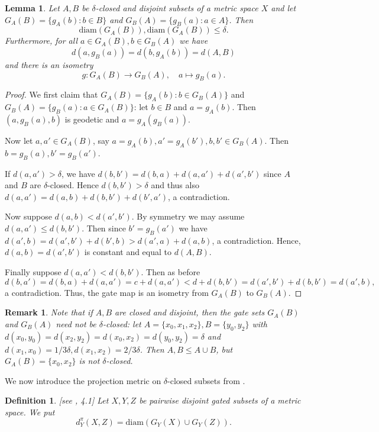 \documentclass{amsart}
\renewcommand{\d}{\delta}
\newcommand{\diam}{\mathrm{diam}}
\newtheorem{definition}[defi]{Definition}
\newtheorem{lemma}[defi]{Lemma}
\newtheorem{remark}[defi]{Remark}
\begin{document}
\begin{lemma}\label{lem: projections}
Let $A, B$ be   $\d$-closed and disjoint subsets of a metric space $X$ and let $G_A(B)=\{g_A(b)\colon b\in B\}$ and $G_B(A)=\{g_B(a)\colon a\in A\}$.
Then \[\diam(G_A(B)), \diam(G_A(B))\leq\d.\] 
Furthermore, for all $a\in G_A(B), b\in G_B(A)$ we have  \[d(a,g_B(a))=d(b,g_A(b))=d(A,B)\] and there is an isometry \[g:G_A(B)\longrightarrow G_B(A),\quad a\mapsto g_B(a).\]


\end{lemma}
\begin{proof}
We first claim that $G_A(B)=\{g_A(b)\colon b\in G_B(A)\}$ and $G_B(A)=\{g_B(a)\colon a\in G_A(B)\}$: let $b\in B$ and $a=g_A(b)$.
Then $(a,g_B(a),b)$ is geodetic and $a=g_A(g_B(a))$.


Now let $a, a'\in G_A(B)$, say $a=g_A(b),a'=g_A(b'), b,b'\in G_B(A)$. Then $b=g_B(a), b'=g_B(a')$.


If $d(a,a')>\d$, we have $d(b,b')=d(b,a)+d(a,a')+d(a',b')$ since $A$ and $B$ are  $\d$-closed. Hence $d(b,b')>\d$ and thus also $d(a,a')=d(a,b)+d(b,b')+d(b',a')$, a contradiction.

Now suppose $d(a,b)<d(a',b')$. By symmetry we may assume $d(a,a')\leq d(b,b')$. Then since $b'=g_B(a')$ we have $d(a',b)=d(a',b')+d(b',b)>d(a',a)+d(a,b)$, a contradiction. Hence, $d(a,b)=d(a',b')$ is constant and equal to $d(A,B)$.

Finally suppose $d(a,a')<d(b,b')$. Then as before 
\[ d(b,a')=d(b,a)+d(a,a')=c+d(a,a')<d+d(b,b')=d(a',b')+d(b,b')=d(a',b),\]
 a contradiction. Thus, the gate map is an isometry from $G_A(B)$ to $G_B(A)$.
\end{proof}


\begin{remark}\label{rem:gate set not closed}
Note that if $A, B$ are closed and disjoint, then the gate sets $G_A(B)$ and $G_B(A)$ need not be   $\d$-closed: let $A=\{x_0,x_1,x_2\}, B=\{y_0,y_2\}$ with $d(x_0,y_0)=d(x_2,y_2)=d(x_0,x_2)=d(y_0,y_2)=\d$ and $d(x_1,x_0)=1/3\d, d(x_1,x_2)=2/3\d$. Then $A, B\leq A\cup B$, but $G_A(B)=\{x_0,x_2\}$ is not   $\d$-closed.
\end{remark}

We now introduce the projection metric on   $\d$-closed subsets from \cite{Bestvina}.

\begin{definition}\label{def:proj distance}\rm{[see \cite{Bestvina}, 4.1] }
Let $X, Y, Z$  be pairwise disjoint gated subsets of a metric space. We put
\[d^\pi_Y (X, Z) = \diam (G_Y(X) \cup G_Y(Z)).\]
\end{definition}
\end{document}

